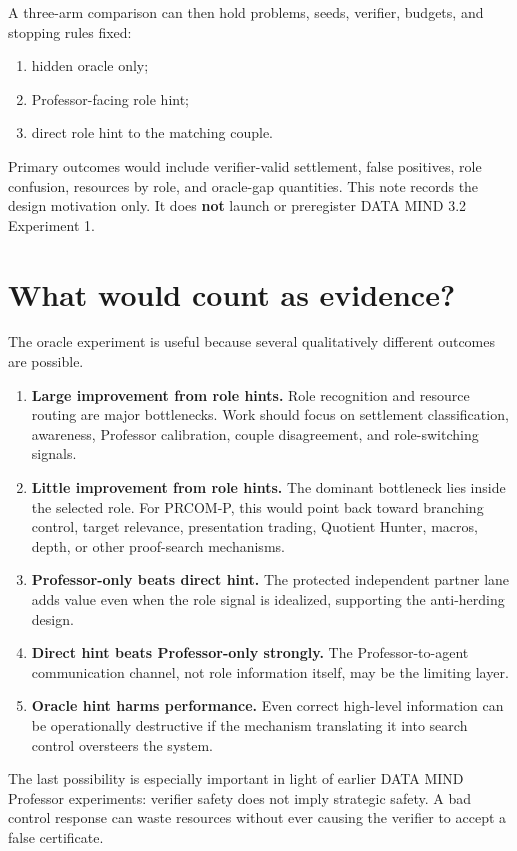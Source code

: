 \documentclass[11pt]{article}
\begin{document}
A three-arm comparison can then hold problems, seeds, verifier, budgets, and stopping rules fixed:
\begin{enumerate}
\item hidden oracle only;
\item Professor-facing role hint;
\item direct role hint to the matching couple.
\end{enumerate}

Primary outcomes would include verifier-valid settlement, false positives, role confusion, resources by role, and oracle-gap quantities. This note records the design motivation only. It does \textbf{not} launch or preregister DATA MIND 3.2 Experiment 1.

\section{What would count as evidence?}

The oracle experiment is useful because several qualitatively different outcomes are possible.

\begin{enumerate}[label=\arabic*.]
\item \textbf{Large improvement from role hints.} Role recognition and resource routing are major bottlenecks. Work should focus on settlement classification, awareness, Professor calibration, couple disagreement, and role-switching signals.
\item \textbf{Little improvement from role hints.} The dominant bottleneck lies inside the selected role. For PRCOM-P, this would point back toward branching control, target relevance, presentation trading, Quotient Hunter, macros, depth, or other proof-search mechanisms.
\item \textbf{Professor-only beats direct hint.} The protected independent partner lane adds value even when the role signal is idealized, supporting the anti-herding design.
\item \textbf{Direct hint beats Professor-only strongly.} The Professor-to-agent communication channel, not role information itself, may be the limiting layer.
\item \textbf{Oracle hint harms performance.} Even correct high-level information can be operationally destructive if the mechanism translating it into search control oversteers the system.
\end{enumerate}

The last possibility is especially important in light of earlier DATA MIND Professor experiments: verifier safety does not imply strategic safety. A bad control response can waste resources without ever causing the verifier to accept a false certificate.
\end{document}
